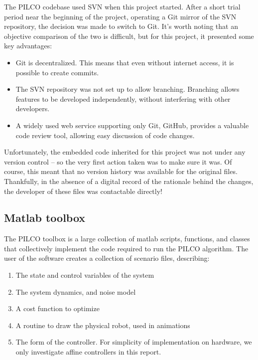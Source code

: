 \documentclass[main.tex]{subfiles}
\begin{document}
	The PILCO codebase used SVN when this project started. After a short trial period near the beginning of the project, operating a Git mirror of the SVN repository, the decision was made to switch to Git. It's worth noting that an objective comparison of the two is difficult, but for this project, it presented some key advantages:
	\begin{itemize}
		\item
			Git is decentralized. This means that even without internet access, it is possible to create commits.

		\item
			The SVN repository was not set up to allow branching. Branching allows features to be developed independently, without interfering with other developers.

		\item
			A widely used web service supporting only Git, GitHub, provides a valuable code review tool, allowing easy discussion of code changes.
	\end{itemize}

	Unfortunately, the embedded code inherited for this project was not under any version control -- so the very first action taken was to make sure it was.
	Of course, this meant that no version history was available for the original files. Thankfully, in the absence of a digital record of the rationale behind the changes, the developer of these files was contactable directly!

	\subsection{Matlab toolbox}

	The PILCO toolbox is a large collection of matlab scripts, functions, and classes that collectively implement the code required to run the PILCO algorithm. The user of the software creates a collection of scenario files, describing:
	\begin{enumerate}[noitemsep]
		\item The state and control variables of the system
		\item The system dynamics, and noise model
		\item A cost function to optimize
		\item A routine to draw the physical robot, used in animations
		\item The form of the controller. For simplicity of implementation on hardware, we only investigate affine controllers in this report.
	\end{enumerate}
\end{document}
